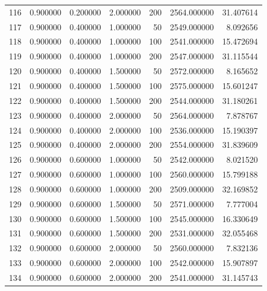 \begin{longtable}{lrrrrrr}
116 & 0.900000 & 0.200000 & 2.000000 & 200 & 2564.000000 & 31.407614 \\
117 & 0.900000 & 0.400000 & 1.000000 & 50 & 2549.000000 & 8.092656 \\
118 & 0.900000 & 0.400000 & 1.000000 & 100 & 2541.000000 & 15.472694 \\
119 & 0.900000 & 0.400000 & 1.000000 & 200 & 2547.000000 & 31.115544 \\
120 & 0.900000 & 0.400000 & 1.500000 & 50 & 2572.000000 & 8.165652 \\
121 & 0.900000 & 0.400000 & 1.500000 & 100 & 2575.000000 & 15.601247 \\
122 & 0.900000 & 0.400000 & 1.500000 & 200 & 2544.000000 & 31.180261 \\
123 & 0.900000 & 0.400000 & 2.000000 & 50 & 2564.000000 & 7.878767 \\
124 & 0.900000 & 0.400000 & 2.000000 & 100 & 2536.000000 & 15.190397 \\
125 & 0.900000 & 0.400000 & 2.000000 & 200 & 2554.000000 & 31.839609 \\
126 & 0.900000 & 0.600000 & 1.000000 & 50 & 2542.000000 & 8.021520 \\
127 & 0.900000 & 0.600000 & 1.000000 & 100 & 2560.000000 & 15.799188 \\
128 & 0.900000 & 0.600000 & 1.000000 & 200 & 2509.000000 & 32.169852 \\
129 & 0.900000 & 0.600000 & 1.500000 & 50 & 2571.000000 & 7.777004 \\
130 & 0.900000 & 0.600000 & 1.500000 & 100 & 2545.000000 & 16.330649 \\
131 & 0.900000 & 0.600000 & 1.500000 & 200 & 2531.000000 & 32.055468 \\
132 & 0.900000 & 0.600000 & 2.000000 & 50 & 2560.000000 & 7.832136 \\
133 & 0.900000 & 0.600000 & 2.000000 & 100 & 2542.000000 & 15.907897 \\
134 & 0.900000 & 0.600000 & 2.000000 & 200 & 2541.000000 & 31.145743 \\
\end{longtable}
